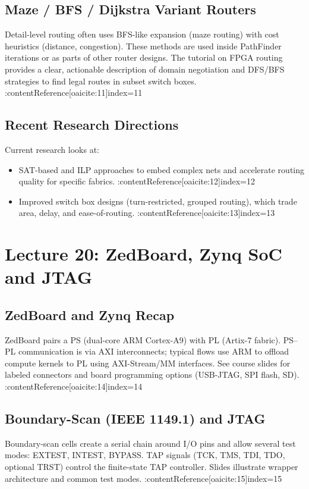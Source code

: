 \documentclass[11pt]{article}
\begin{document}
\subsection{Maze / BFS / Dijkstra Variant Routers}
Detail-level routing often uses BFS-like expansion (maze routing) with cost heuristics (distance, congestion). These methods are used inside PathFinder iterations or as parts of other router designs. The tutorial on FPGA routing provides a clear, actionable description of domain negotiation and DFS/BFS strategies to find legal routes in subset switch boxes. :contentReference[oaicite:11]{index=11}

\subsection{Recent Research Directions}
Current research looks at:
\begin{itemize}
  \item SAT-based and ILP approaches to embed complex nets and accelerate routing quality for specific fabrics. :contentReference[oaicite:12]{index=12}
  \item Improved switch box designs (turn-restricted, grouped routing), which trade area, delay, and ease-of-routing. :contentReference[oaicite:13]{index=13}
\end{itemize}

\newpage

\section{Lecture 20: ZedBoard, Zynq SoC and JTAG}

\subsection{ZedBoard and Zynq Recap}
ZedBoard pairs a PS (dual-core ARM Cortex-A9) with PL (Artix-7 fabric). PS–PL communication is via AXI interconnects; typical flows use ARM to offload compute kernels to PL using AXI-Stream/MM interfaces. See course slides for labeled connectors and board programming options (USB-JTAG, SPI flash, SD). :contentReference[oaicite:14]{index=14}

\subsection{Boundary-Scan (IEEE 1149.1) and JTAG}
Boundary-scan cells create a serial chain around I/O pins and allow several test modes: EXTEST, INTEST, BYPASS. TAP signals (TCK, TMS, TDI, TDO, optional TRST) control the finite-state TAP controller. Slides illustrate wrapper architecture and common test modes. :contentReference[oaicite:15]{index=15}
\end{document}
